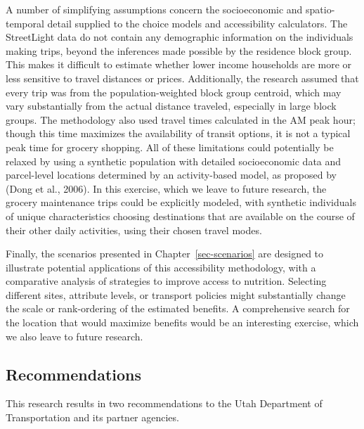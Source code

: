 \documentclass[
  letterpaper,
  authoryear,
  review,
  3p]{elsarticle}
\begin{document}
A number of simplifying assumptions concern the socioeconomic and
spatio-temporal detail supplied to the choice models and accessibility
calculators. The StreetLight data do not contain any demographic
information on the individuals making trips, beyond the inferences made
possible by the residence block group. This makes it difficult to
estimate whether lower income households are more or less sensitive to
travel distances or prices. Additionally, the research assumed that
every trip was from the population-weighted block group centroid, which
may vary substantially from the actual distance traveled, especially in
large block groups. The methodology also used travel times calculated in
the AM peak hour; though this time maximizes the availability of transit
options, it is not a typical peak time for grocery shopping. All of
these limitations could potentially be relaxed by using a synthetic
population with detailed socioeconomic data and parcel-level locations
determined by an activity-based model, as proposed by (Dong et al.,
2006). In this exercise, which we leave to future research, the grocery
maintenance trips could be explicitly modeled, with synthetic
individuals of unique characteristics choosing destinations that are
available on the course of their other daily activities, using their
chosen travel modes.

Finally, the scenarios presented in Chapter~\ref{sec-scenarios} are
designed to illustrate potential applications of this accessibility
methodology, with a comparative analysis of strategies to improve access
to nutrition. Selecting different sites, attribute levels, or transport
policies might substantially change the scale or rank-ordering of the
estimated benefits. A comprehensive search for the location that would
maximize benefits would be an interesting exercise, which we also leave
to future research.

\hypertarget{sec-recommend}{%
\subsection{Recommendations}\label{sec-recommend}}

This research results in two recommendations to the Utah Department of
Transportation and its partner agencies.
\end{document}
